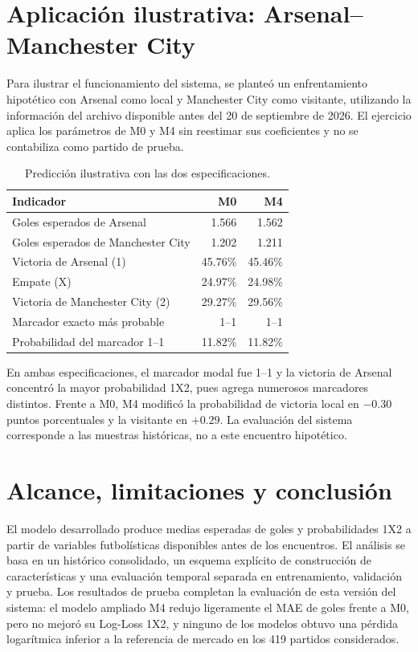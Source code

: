 \documentclass[11pt,a4paper]{article}
\begin{document}
\section{Aplicación ilustrativa: Arsenal--Manchester City}
Para ilustrar el funcionamiento del sistema, se planteó un enfrentamiento hipotético con Arsenal como local y Manchester City como visitante, utilizando la información del archivo disponible antes del 20 de septiembre de 2026. El ejercicio aplica los parámetros de M0 y M4 sin reestimar sus coeficientes y no se contabiliza como partido de prueba.

\begin{table}[H]
\centering\small
\caption{Predicción ilustrativa con las dos especificaciones.}
\begin{tabularx}{\textwidth}{Xrr}
\toprule
Indicador & M0 & M4\\
\midrule
Goles esperados de Arsenal & 1.566 & 1.562\\
Goles esperados de Manchester City & 1.202 & 1.211\\
Victoria de Arsenal (1) & 45.76\% & 45.46\%\\
Empate (X) & 24.97\% & 24.98\%\\
Victoria de Manchester City (2) & 29.27\% & 29.56\%\\
Marcador exacto más probable & 1--1 & 1--1\\
Probabilidad del marcador 1--1 & 11.82\% & 11.82\%\\
\bottomrule
\end{tabularx}
\end{table}

En ambas especificaciones, el marcador modal fue 1--1 y la victoria de Arsenal concentró la mayor probabilidad 1X2, pues agrega numerosos marcadores distintos. Frente a M0, M4 modificó la probabilidad de victoria local en $-0.30$ puntos porcentuales y la visitante en $+0.29$. La evaluación del sistema corresponde a las muestras históricas, no a este encuentro hipotético.

\section{Alcance, limitaciones y conclusión}
El modelo desarrollado produce medias esperadas de goles y probabilidades 1X2 a partir de variables futbolísticas disponibles antes de los encuentros. El análisis se basa en un histórico consolidado, un esquema explícito de construcción de características y una evaluación temporal separada en entrenamiento, validación y prueba. Los resultados de prueba completan la evaluación de esta versión del sistema: el modelo ampliado M4 redujo ligeramente el MAE de goles frente a M0, pero no mejoró su Log-Loss 1X2, y ninguno de los modelos obtuvo una pérdida logarítmica inferior a la referencia de mercado en los 419 partidos considerados.
\end{document}
